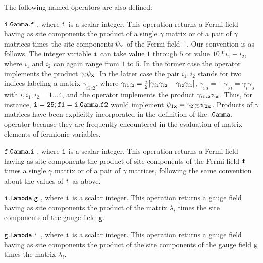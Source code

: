 
The following named operators are also defined:

{\parindent=0pt
$\tt i.Gamma.f$ , where $\tt i$ is a scalar integer.  
This operation returns a Fermi field
having as site components the product of a single $\gamma$ matrix
or of a pair of $\gamma$ matrices times the site components $\psi_{\bf x}$
of the Fermi field $\tt f$.  Our convention is as follows. The integer
variable $\tt i$ can take value $1$ through $5$ or value
$10*i_1+i_2$, where $i_1$ and $i_2$ can again range from
$1$ to $5$.  In the former case the operator implements the product
$\gamma_i \psi_{\bf x}$. In the latter case the pair $i_1,i_2$ 
stands for two indices labeling a matrix 
$\gamma_{i{\scriptscriptstyle1}\,i{\scriptscriptstyle2}}$, where
$\gamma_{i{\scriptscriptstyle1}\,i{\scriptscriptstyle2}}=
{\imath \over 2} [\gamma_{i{\scriptscriptstyle1}}
\gamma_{i{\scriptscriptstyle2}}-
\gamma_{i{\scriptscriptstyle2}}
\gamma_{i{\scriptscriptstyle1}}]$,  
$\gamma_{i\,5}=-\gamma_{5\,i}=\gamma_i \gamma_5$ with
$i,i_1,i_2 = 1 \dots 4$, and the operator implements the product
$\gamma_{i{\scriptscriptstyle1}\,i{\scriptscriptstyle2}}\psi_{\bf x}$.
Thus, for instance, $\tt i=25; f1=i.Gamma.f2$ would implement
$\psi_{1{\bf x}} = \gamma_2 \gamma_5 \psi_{2{\bf x}}$.  Products
of $\gamma$ matrices have been explicitly incorporated in the
definition of the $\tt .Gamma.$ operator because they are
frequently encountered in the evaluation of matrix elements
of fermionic variables.

$\tt f.Gamma.i$ , where $\tt i$ is a scalar integer.  
This operation returns a Fermi field
having as site components the product of site components 
of the Fermi field $\tt f$ times a single $\gamma$ matrix
or of a pair of $\gamma$ matrices, following the same convention
about the values of $\tt i$ as above.

$\tt i.Lambda.g$ , where $\tt i$ is a scalar integer.  
This operation returns a gauge field
having as site components the product of the matrix $\lambda_i$ 
times the site components of the gauge field $\tt g$.

$\tt g.Lambda.i$ , where $\tt i$ is a scalar integer. 
This operation returns a gauge field
having as site components the product of the site components 
of the gauge field $\tt g$ times the matrix $\lambda_i$.}

